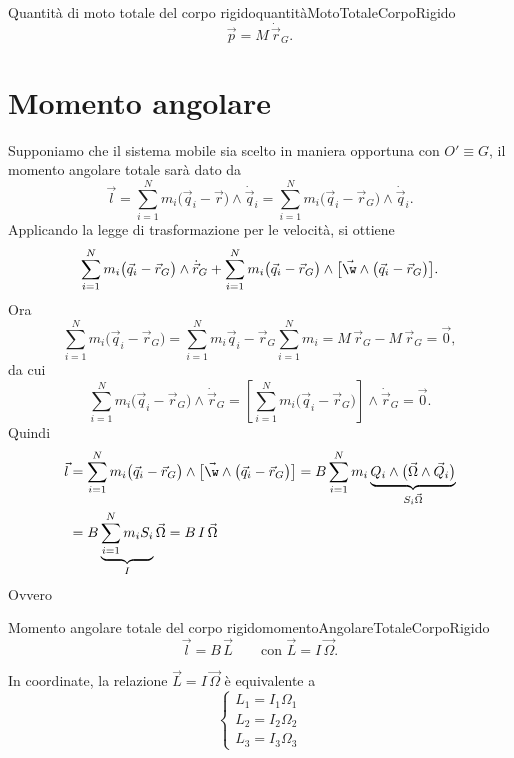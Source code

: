 \begin{remark}{Quantità di moto totale del corpo rigido}{quantitàMotoTotaleCorpoRigido}
	\[
		\vec{p} = M\,\dot{\vec{r}}_G.
	\]
\end{remark}

\section{Momento angolare}

Supponiamo che il sistema mobile sia scelto in maniera opportuna con \(O'\equiv G\), il momento angolare totale sarà dato da
\[
	\vec{l} = \sum_{i=1}^N m_i \big(\vec{q}_i-\vec{r}\big) \wedge \dot{\vec{q}}_i = \sum_{i=1}^N m_i \big(\vec{q}_i - \vec{r}_G\big) \wedge \dot{\vec{q}}_i.
\]
Applicando la legge di trasformazione per le velocità, si ottiene
\[
	\sum_{i=1}^N m_i \big(\vec{q}_i -\vec{r}_G\big) \wedge \dot{\vec{r}}_G + \sum_{i=1}^N m_i\big(\vec{q}_i-\vec{r}_G\big) \wedge \big[\vec{\w}\wedge\big(\vec{q}_i-\vec{r}_G\big)\big].
\]
Ora
\[
	\sum_{i=1}^N m_i\big(\vec{q}_i-\vec{r}_G\big) = \sum_{i=1}^N m_i \vec{q}_i - \vec{r}_G \sum_{i=1}^N m_i = M\,\vec{r}_G - M\,\vec{r}_G = \vec{0},
\]
da cui
\[
	\sum_{i=1}^N m_i \big(\vec{q}_i-\vec{r}_G\big) \wedge \dot{\vec{r}}_G = \left[\sum_{i=1}^N m_i \big(\vec{q}_i-\vec{r}_G\big)\right] \wedge \dot{\vec{r}}_G = \vec{0}.
\]
Quindi
\[
	\begin{split}
		\vec{l} & = \sum_{i=1}^N m_i\big(\vec{q}_i-\vec{r}_G\big) \wedge \big[\vec{\w} \wedge\big(\vec{q}_i-\vec{r}_G\big)\big] = B \sum_{i=1}^N m_i \underbrace{Q_i \wedge \big(\vec{\Omega} \wedge \vec{Q}_i\big)}_{S_i \vec{\Omega}}\\
		& = B \underbrace{\sum_{i=1}^N m_i S_i}_{I} \vec{\Omega} = B\,I\,\vec{\Omega}
	\end{split}
\]
Ovvero

\begin{remark}{Momento angolare totale del corpo rigido}{momentoAngolareTotaleCorpoRigido}
	\[
		\vec{l} = B\,\vec{L} \qquad\text{con }\vec{L} = I\,\vec{\Omega}.
	\]
\end{remark}

\begin{oss}
	In coordinate, la relazione \(\vec{L}=I\,\vec{\Omega}\) è equivalente a
	\[
		\begin{cases}
			L_1 = I_1 \Omega_1 \\
			L_2 = I_2 \Omega_2 \\
			L_3 = I_3 \Omega_3
		\end{cases}
	\]
\end{oss}

